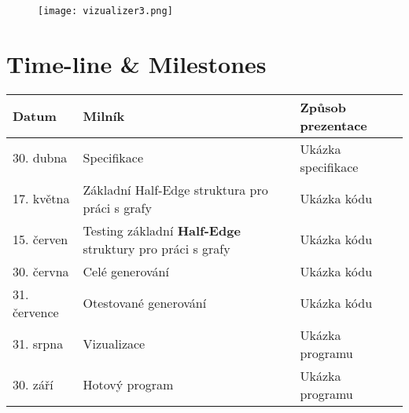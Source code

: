 \documentclass{article}
\begin{document}
\begin{figure}[ht]
    \centering
    \texttt{[image: vizualizer3.png]}
\end{figure}


\section{Time-line \& Milestones}
\begin{tabular}{ |p{3cm}|p{5cm}|p{3cm}| }
\hline
Datum & Milník & Způsob prezentace\\
\hline
\hline
30. dubna & Specifikace & Ukázka specifikace\\
\hline
17. května & Základní Half-Edge struktura pro práci s grafy & Ukázka kódu\\
\hline
15. červen & Testing základní \textbf{Half-Edge} struktury pro práci s grafy & Ukázka kódu\\
\hline
30. června & Celé generování & Ukázka kódu\\
\hline
31. července & Otestované generování & Ukázka kódu\\
\hline
31. srpna & Vizualizace & Ukázka programu\\
\hline
30. září & Hotový program & Ukázka programu\\
\hline

\end{tabular}





\end{document}
